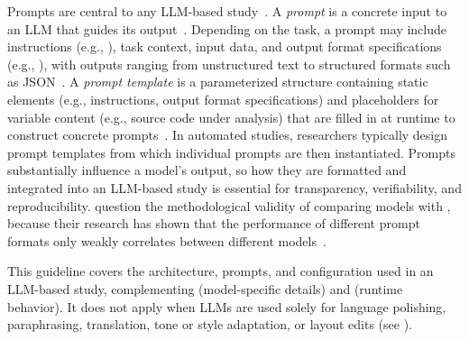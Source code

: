 Prompts are central to any LLM-based study~\cite{DBLP:conf/iclr/Sclar0TS24}.
A \emph{prompt} is a concrete input to an LLM that guides its output~\cite{DBLP:journals/corr/abs-2406-06608}.
Depending on the task, a prompt may include instructions (e.g., ), task context, input data, and output format specifications (e.g., ), with outputs ranging from unstructured text to structured formats such as JSON~\cite{promptingguide_elements}.
A \emph{prompt template} is a parameterized structure containing static elements (e.g., instructions, output format specifications) and placeholders for variable content (e.g., source code under analysis) that are filled in at runtime to construct concrete prompts~\cite{DBLP:journals/corr/abs-2406-06608}.
In automated studies, researchers typically design prompt templates from which individual prompts are then instantiated.
Prompts substantially influence a model's output, so how they are formatted and integrated into an LLM-based study is essential for transparency, verifiability, and reproducibility.
\citeauthor{DBLP:conf/iclr/Sclar0TS24} question the methodological validity of comparing models with , because their research has shown that the performance of different prompt formats only weakly correlates between different models~\cite{DBLP:conf/iclr/Sclar0TS24}.

This guideline covers the architecture, prompts, and configuration used in an LLM-based study, complementing \modelversion (model-specific details) and \traces (runtime behavior).
It does not apply when LLMs are used solely for language polishing, paraphrasing, translation, tone or style adaptation, or layout edits (see \scope).

